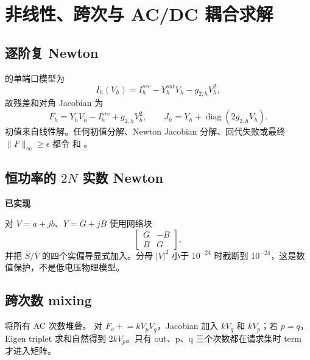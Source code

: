 \section{非线性、跨次与 AC/DC 耦合求解}
\subsection{逐阶复 Newton}
 的单端口模型为
\begin{equation}
I_h(V_h)=I_h^{src}-Y_h^{out}V_h-g_{2,h}V_h^2,
\end{equation}
故残差和对角 Jacobian 为
\begin{equation}
F_h=Y_hV_h-I_h^{src}+g_{2,h}V_h^2,\qquad
J_h=Y_h+\operatorname{diag}(2g_{2,h}V_h).
\end{equation}
初值来自线性解。任何初值分解、Newton Jacobian 分解、回代失败或最终
$\|F\|_\infty\ge\epsilon$ 都令  和 。

\subsection{恒功率的 \texorpdfstring{$2N$}{2N} 实数 Newton}
\textbf{已实现}\par\noindent
{} 对
$V=a+jb$、$Y=G+jB$ 使用网络块
\begin{equation}
\begin{bmatrix}G&-B\\B&G\end{bmatrix},
\end{equation}
并把 $\overline S/\overline V$ 的四个实偏导显式加入。分母 $|V|^2$ 小于 $10^{-24}$ 时截断到
$10^{-24}$，这是数值保护，不是低电压物理模型。

\subsection{跨次数 mixing}
 将所有 AC 次数堆叠。
对 $F_o\mathrel{+}=kV_pV_q$，Jacobian 加入 $kV_q$ 和 $kV_p$；若 $p=q$，Eigen triplet 求和自然得到
$2kV_p$。只有 out、p、q 三个次数都在请求集时 term 才进入矩阵。

